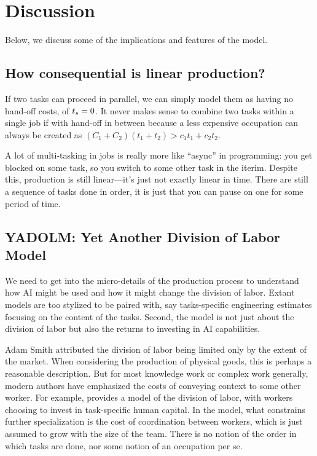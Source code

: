 \documentclass{article}
\theoremstyle{plain}
\theoremstyle{plain}
\begin{document}
\section{Discussion}
Below, we discuss some of the implications and features of the model. 

\subsection{How consequential is linear production?}
If two tasks can proceed in parallel, we can simply model them as having no hand-off costs, of $t_{s} = 0$.
It never makes sense to combine two tasks within a single job if with hand-off in between because a less expensive occupation can always be created as $(C_1 + C_2) (t_1 + t_2) > c_1 t_1 + c_2 t_2$.


A lot of multi-tasking in jobs is really more like ``async'' in programming: you get blocked on some task, so you switch to some other task in the iterim.
Despite this, production is still linear---it's just not exactly linear in time.
There are still a sequence of tasks done in order, it is just that you can pause on one for some period of time.



\subsection{YADOLM: Yet Another Division of Labor Model}
We need to get into the micro-details of the production process to understand how AI might be used and how it might change the division of labor. 
Extant models are too stylized to be paired with, say tasks-specific engineering estimates focusing on the content of the tasks.
Second, the model is not just about the division of labor but also the returns to investing in AI capabilities.

Adam Smith attributed the division of labor being limited only by the extent of the market. 
When considering the production of physical goods, this is perhaps a reasonable description. 
But for most knowledge work or complex work generally, modern authors have emphasized the costs of conveying context to some other worker.
For example, \cite{becker1992division} provides a model of the division of labor, with workers choosing to invest in task-specific human capital.
In the model, what constrains further specialization is the cost of coordination between workers, which is just assumed to grow with the size of the team.
There is no notion of the order in which tasks are done, nor some notion of an occupation per se. 
\end{document}
